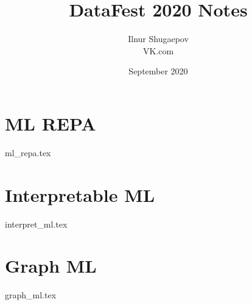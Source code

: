 \documentclass[openany,11pt]{book}
\title{DataFest 2020 Notes}
\author{Ilnur Shugaepov \\ VK.com}
\date{September 2020}
\begin{document}
\maketitle
\setcounter{tocdepth}{1}
\small{\tableofcontents}
\newpage

\chapter{ML REPA}
{ml_repa.tex}

\chapter{Interpretable ML}
{interpret_ml.tex}

\chapter{Graph ML}
{graph_ml.tex}
\end{document}
